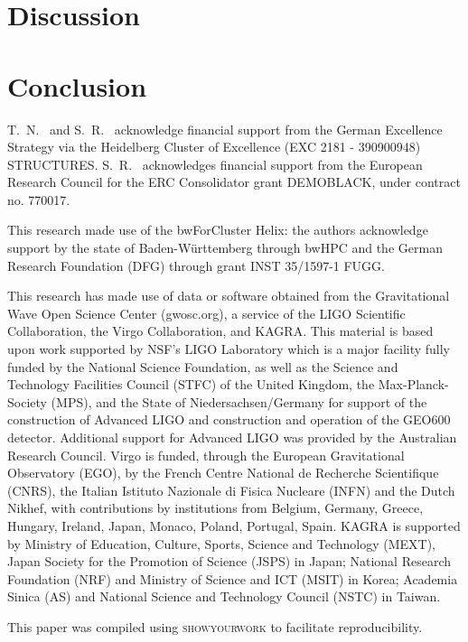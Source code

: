 \documentclass[aps,prd,twocolumn,superscriptaddress,preprintnumbers,nofootinbib,hidelinks]{revtex4-2}
\begin{document}

\section{Discussion}
\label{sec:discussion}




\section{Conclusion}
\label{sec:conclusion}

\begin{acknowledgments}
T.~N.~ and S.~R.~ acknowledge financial support from the German Excellence Strategy via the Heidelberg Cluster of Excellence (EXC 2181 - 390900948) STRUCTURES.
S.~R.~ acknowledges financial support from the European Research Council for the ERC Consolidator grant DEMOBLACK, under contract no. 770017. 

This research made use of the bwForCluster Helix: the authors acknowledge support by the state of Baden-Württemberg through bwHPC and the German Research Foundation (DFG) through grant INST 35/1597-1 FUGG.

This research has made use of data or software obtained from the Gravitational Wave Open Science Center (gwosc.org), a service of the LIGO Scientific Collaboration, the Virgo Collaboration, and KAGRA. This material is based upon work supported by NSF's LIGO Laboratory which is a major facility fully funded by the National Science Foundation, as well as the Science and Technology Facilities Council (STFC) of the United Kingdom, the Max-Planck-Society (MPS), and the State of Niedersachsen/Germany for support of the construction of Advanced LIGO and construction and operation of the GEO600 detector. Additional support for Advanced LIGO was provided by the Australian Research Council. Virgo is funded, through the European Gravitational Observatory (EGO), by the French Centre National de Recherche Scientifique (CNRS), the Italian Istituto Nazionale di Fisica Nucleare (INFN) and the Dutch Nikhef, with contributions by institutions from Belgium, Germany, Greece, Hungary, Ireland, Japan, Monaco, Poland, Portugal, Spain. KAGRA is supported by Ministry of Education, Culture, Sports, Science and Technology (MEXT), Japan Society for the Promotion of Science (JSPS) in Japan; National Research Foundation (NRF) and Ministry of Science and ICT (MSIT) in Korea; Academia Sinica (AS) and National Science and Technology Council (NSTC) in Taiwan.

This paper was compiled using \textsc{showyourwork} \cite{Luger2021} to facilitate reproducibility.

\end{acknowledgments}


\end{document}
